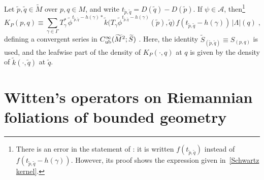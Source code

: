\documentclass{memo-l}
\theoremstyle{plain}
\theoremstyle{definition}
\theoremstyle{remark}
\renewcommand{\AA}{\mathcal{A}}
\newcommand{\Cinftyub}{C^\infty_{\text{\rm ub}}}
\numberwithin{section}{chapter}
\numberwithin{equation}{section}%
\begin{document}
Let $\tilde p,\tilde q\in\widetilde M$ over $p,q\in M$, and write $t_{\tilde p,\tilde q}=D(\tilde q)-D(\tilde p)$. If $\psi\in\AA$, then\footnote{There is an error in the statement of \cite[Proposition~10.3]{AlvKordyLeichtnam2020}: it is written $f(t_{\tilde p,\tilde q})$ instead of $f(t_{\tilde p,\tilde q}-h(\gamma))$. However, its proof shows the expression given in~\eqref{Schwartz kernel}.}
\begin{equation}\label{Schwartz kernel}
K_P(p,q)
\equiv\sum_{\gamma\in\Gamma}
T_\gamma^*\,\tilde\phi^{t_{\tilde p,\tilde q}-h(\gamma)*}
\tilde k\big(T_\gamma\tilde\phi^{t_{\tilde p,\tilde q}-h(\gamma)}(\tilde p),\tilde q\big)\,f(t_{\tilde p,\tilde q}-h(\gamma))\,|\Lambda|(q)\;,
\end{equation}
defining a convergent series in $\Cinftyub(\widetilde M^2;\widetilde S)$ \cite[Proposition~10.3]{AlvKordyLeichtnam2020}. Here, the identity $\widetilde S_{(\tilde p,\tilde q)}\equiv S_{(p,q)}$ is used, and the leafwise part of the density of $K_P(\cdot,q)$ at $q$ is given by the density of $\tilde k(\cdot,\tilde q)$ at $\tilde q$.



\section{Witten's operators on Riemannian foliations of bounded geometry}
\label{s: Witten's opers on Riem folns of bd geom}
\end{document}
